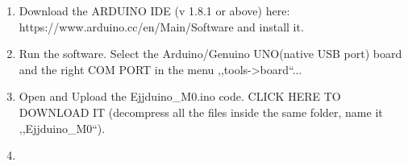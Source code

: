 \begin{enumerate}
  \item Download the ARDUINO IDE (v 1.8.1 or above) here: https://www.arduino.cc/en/Main/Software and install it.
  \item Run the software. Select the Arduino/Genuino UNO(native USB port) board and the right COM PORT in the menu ,,tools->board``...
  \item Open and Upload the Ejjduino\_M0.ino code. CLICK HERE TO DOWNLOAD IT (decompress all the files inside the same folder, name it ,,Ejjduino\_M0``).
  \item 
\end{enumerate}
